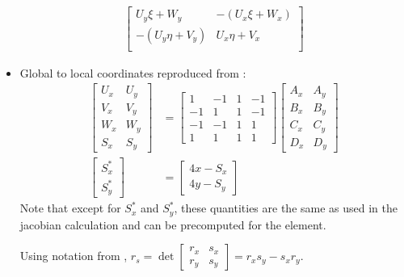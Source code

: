 \documentclass[10pt]{article}
\begin{document}
\begin{itemize}
\begin{align}
\begin{bmatrix}
                U_y \xi + W_y & -(U_x \xi + W_x) \\
                -(U_y \eta + V_y) & U_x \eta + V_x \\
            \end{bmatrix}
        \end{align}
    \item Global to local coordinates reproduced from \textcite{hua90}:
        \begin{align}
            \begin{bmatrix}
                U_x & U_y \\
                V_x & V_y \\
                W_x & W_y \\
                S_x & S_y
            \end{bmatrix}
            &=
            \begin{bmatrix}
                1 & -1 & 1 & -1 \\
                -1 & 1 & 1 & -1 \\
                -1 & -1 & 1 & 1 \\
                1 & 1 & 1 & 1
            \end{bmatrix}
            \begin{bmatrix}
                A_x & A_y \\
                B_x & B_y \\
                C_x & C_y \\
                D_x & D_y
            \end{bmatrix}
            \\
            \begin{bmatrix}
                S^*_x \\
                S^*_y
            \end{bmatrix}
            &=
            \begin{bmatrix}
                4 x - S_x \\
                4 y - S_y
            \end{bmatrix}
        \end{align}
        Note that except for $S^*_x$ and $S^*_y$, these quantities are the same as used in the jacobian calculation and can be precomputed for the element.

        Using notation from \textcite{hua90}, $r_s = \det \begin{bmatrix} r_x & s_x \\ r_y & s_y \end{bmatrix} = r_x s_y - s_x r_y $.
\end{itemize}
\printbibliography
\end{document}
